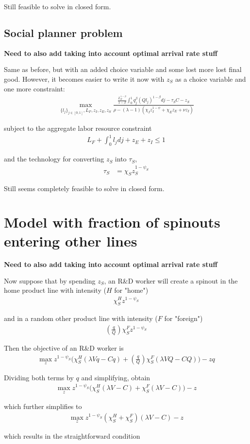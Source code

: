 \documentclass[12pt,english]{article}
\theoremstyle{remark}
\begin{document}
Still feasible to solve in closed form. 

\subsection{Social planner problem}

\textbf{Need to also add taking into account optimal arrival rate stuff}

Same as before, but with an added choice variable and some lost more lost final good. However, it becomes easier to write it now with $z_S$ as a choice variable and one more constraint: 
\begin{align*}
\max_{\{l_j\}_{j\in[0,1]},L_F,z_I,z_E,z_S} \frac{\frac{L_F^{1-\beta}}{1-\beta} \int_0^1 q_j^{\beta} (Q l_j)^{1-\beta} dj - \tau_S C - z_S}{\rho - (\lambda-1)(\chi_I z_I^{1-\psi} + \chi_E z_E + \nu z_I)} 
\end{align*}

subject to the aggregate labor resource constraint
\begin{align*}
L_F + \int_0^1 l_j dj + z_E + z_I \le 1
\end{align*}

and the technology for converting $z_S$ into $\tau_S$,
\begin{align*}
	\tau_S &= \chi_S z_S^{1-\psi_S}
\end{align*}

Still seems completely feasible to solve in closed form. 


\section{Model with fraction of spinouts entering other lines}

\textbf{Need to also add taking into account optimal arrival rate stuff}


Now suppose that by spending $z_S$, an R\&D worker will create a spinout in the home product line with intensity ($H$ for "home")
\begin{align*}
	\chi_S^H z^{1-\psi_S}
\end{align*}

and in a random other product line with intensity ($F$ for "foreign")
\begin{align*}
	(\frac{q}{Q}) \chi_S^F z^{1-\psi_S}
\end{align*}

Then the objective of an R\&D worker is 
\begin{align*}
	\max_z z^{1-\psi_S} \Big(\chi_S^H(\lambda Vq  - Cq) + (\frac{q}{Q}) \chi_S^F(\lambda V Q - CQ) \Big) - zq
\end{align*}

Dividing both terms by $q$ and simplifying, obtain
\begin{align*}
	\max_z z^{1-\psi_S} \Big(\chi_S^H(\lambda V  - C) + \chi_S^F(\lambda V - C) \Big) - z
\end{align*} 

which further simplifies to
\begin{align*}
	\max_z z^{1-\psi_S} (\chi_S^H + \chi_S^F)(\lambda V  - C) - z	
\end{align*}

which results in the straightforward condition 
\end{document}

